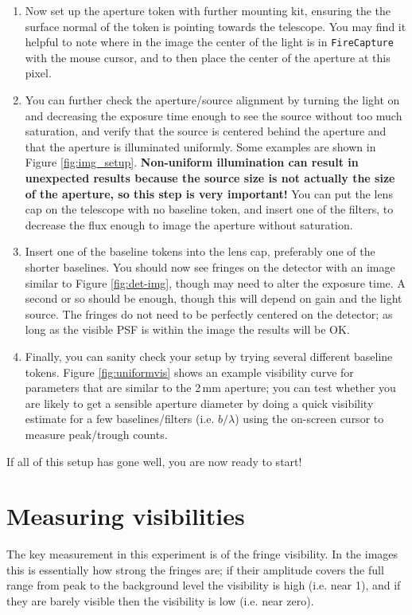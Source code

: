 \documentclass[11pt]{article}
\begin{document}
\begin{enumerate}
    \item Now set up the aperture token with further mounting kit, ensuring the the surface normal of the token is pointing towards the telescope. You may find it helpful to note where in the image the center of the light is in \texttt{FireCapture} with the mouse cursor, and to then place the center of the aperture at this pixel.
    \item You can further check the aperture/source alignment by turning the light on and decreasing the exposure time enough to see the source without too much saturation, and verify that the source is centered behind the aperture and that the aperture is illuminated uniformly. Some examples are shown in Figure \ref{fig:img_setup}. \textbf{Non-uniform illumination can result in unexpected results because the source size is not actually the size of the aperture, so this step is very important!} You can put the lens cap on the telescope with no baseline token, and insert one of the filters, to decrease the flux enough to image the aperture without saturation.
    \item Insert one of the baseline tokens into the lens cap, preferably one of the shorter baselines. You should now see fringes on the detector with an image similar to Figure \ref{fig:det-img}, though may need to alter the exposure time. A second or so should be enough, though this will depend on gain and the light source. The fringes do not need to be perfectly centered on the detector; as long as the visible PSF is within the image the results will be OK.
    \item Finally, you can sanity check your setup by trying several different baseline tokens. Figure \ref{fig:uniformvis} shows an example visibility curve for parameters that are similar to the 2\,mm aperture; you can test whether you are likely to get a sensible aperture diameter by doing a quick visibility estimate for a few baselines/filters (i.e. $b/\lambda$) using the on-screen cursor to measure peak/trough counts.
\end{enumerate}

If all of this setup has gone well, you are now ready to start!

\clearpage
\section{Measuring visibilities}\label{sec:meas}

The key measurement in this experiment is of the fringe visibility. In the images this is essentially how strong the fringes are; if their amplitude covers the full range from peak to the background level the visibility is high (i.e. near 1), and if they are barely visible then the visibility is low (i.e. near zero).
\end{document}
